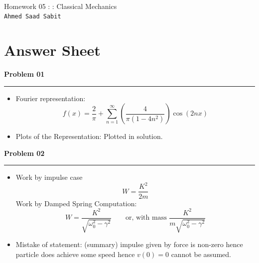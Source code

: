 \documentclass[letterpaper]{article}
\begin{document}
\pagestyle{fancy}
\fancyhead{} %
\fancyhead[C]{\rightmark}
\fancyfoot{}
\renewcommand{\footrulewidth}{0.4pt}

\newlength\adder
\setlength\adder{1cm}
\addtolength\headwidth{2\adder}
\fancyheadoffset{\adder}

\fancyfoot[C]{\vspace{0.3cm}\\ \thepage}


\begin{center}
\ 
	\vspace{1cm} 

	\Huge{\textsf{Homework 05 : : Classical Mechanics}}
	\\
	\vspace{1cm}
	\Large{\texttt{Ahmed Saad Sabit}}
	\vspace{1.5cm} 
\end{center}
{\flushright
\section*{Answer Sheet} 
}
\vspace{0.3cm}
\textbf{Problem 01} 

\noindent\rule{\textwidth}{0.2pt} 
\begin{itemize}
	\item Fourier representation: 
		\[ f(x) = \frac{2}{ \pi } + \sum_{n=1}^{\infty} \left(\frac{4}{\pi (1- 4n^2 )}\right) \cos(2 n x) \] 
	\item Plots of the Representation: Plotted in solution. 
\end{itemize}


\vspace{0.4cm}
\textbf{Problem 02}\\
\noindent\rule{\textwidth}{0.2pt} 
\begin{itemize}
	\item Work by impulse case \[W = \frac{K^2}{2m}\]  Work by Damped Spring Computation: \[
			W = \frac{K^2}{\sqrt{\omega_0^2 - \gamma^2} } \qquad \text{or, with mass } \frac{K^2}{m \sqrt{\omega_0^2 - \gamma^2} }
	\] 
\item Mistake of statement: (summary) impulse given by force is non-zero hence particle does achieve some speed hence $v(0)=0$ cannot be assumed.  
\end{itemize}
\end{document}
